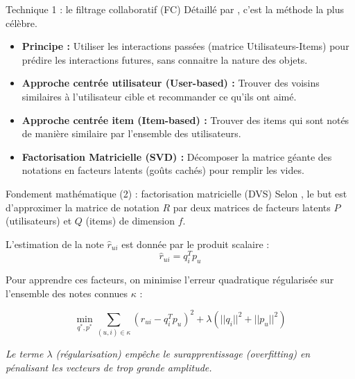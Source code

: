\documentclass[9pt, aspectratio=169]{beamer}
\begin{document}
\begin{frame}{Technique 1 : le filtrage collaboratif (FC)}
    Détaillé par \textcite{Koren2022Advances}, c'est la méthode la plus célèbre.
    \begin{itemize}
        \item \textbf{Principe :} Utiliser les interactions passées (matrice Utilisateurs-Items) pour prédire les interactions futures, sans connaitre la nature des objets.
        \item \textbf{Approche centrée utilisateur (User-based) :} Trouver des voisins similaires à l'utilisateur cible et recommander ce qu'ils ont aimé.
        \item \textbf{Approche centrée item (Item-based) :} Trouver des items qui sont notés de manière similaire par l'ensemble des utilisateurs.
        \item \textbf{Factorisation Matricielle (SVD) :} Décomposer la matrice géante des notations en facteurs latents (goûts cachés) pour remplir les vides.
    \end{itemize}
\end{frame}

\begin{frame}{Fondement mathématique (2) : factorisation matricielle (DVS)}
    Selon \textcite{Koren2022Advances}, le but est d'approximer la matrice de notation \(R\) par deux matrices de facteurs latents \(P\) (utilisateurs) et \(Q\) (items) de dimension \(f\).
    
    L'estimation de la note \(\hat{r}_{ui}\) est donnée par le produit scalaire :
    \[ \hat{r}_{ui} = q_i^T p_u \]
    
    Pour apprendre ces facteurs, on minimise l'erreur quadratique régularisée sur l'ensemble des notes connues \(\kappa\) :
    
    \begin{equation}
        \min_{q^*, p^*} \sum_{(u,i) \in \kappa} (r_{ui} - q_i^T p_u)^2 + \lambda(||q_i||^2 + ||p_u||^2)
    \end{equation}
    
    \footnotesize
    \textit{Le terme \(\lambda\) (régularisation) empêche le surapprentissage (overfitting) en pénalisant les vecteurs de trop grande amplitude.}
\end{frame}
\end{document}
